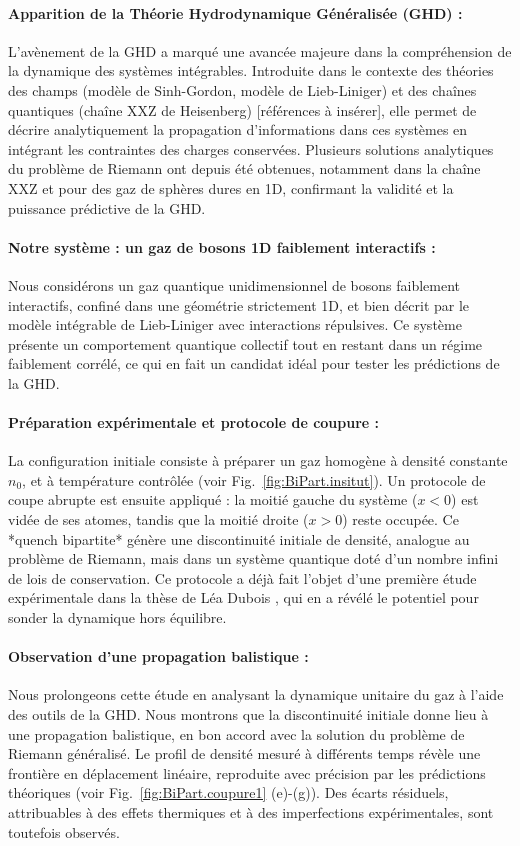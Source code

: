 \paragraph{Apparition de la Théorie Hydrodynamique Généralisée (GHD) :}
L’avènement de la GHD a marqué une avancée majeure dans la compréhension de la dynamique des systèmes intégrables. Introduite dans le contexte des théories des champs (modèle de Sinh-Gordon, modèle de Lieb-Liniger) et des chaînes quantiques (chaîne XXZ de Heisenberg) [références à insérer], elle permet de décrire analytiquement la propagation d’informations dans ces systèmes en intégrant les contraintes des charges conservées. Plusieurs solutions analytiques du problème de Riemann ont depuis été obtenues, notamment dans la chaîne XXZ et pour des gaz de sphères dures en 1D, confirmant la validité et la puissance prédictive de la GHD.

\paragraph{Notre système : un gaz de bosons 1D faiblement interactifs :}
Nous considérons un gaz quantique unidimensionnel de bosons faiblement interactifs, confiné dans une géométrie strictement 1D, et bien décrit par le modèle intégrable de Lieb-Liniger avec interactions répulsives. Ce système présente un comportement quantique collectif tout en restant dans un régime faiblement corrélé, ce qui en fait un candidat idéal pour tester les prédictions de la GHD.

\paragraph{Préparation expérimentale et protocole de coupure :}
La configuration initiale consiste à préparer un gaz homogène à densité constante $n_0$, et à température contrôlée (voir Fig.~\ref{fig:BiPart.insitut}). Un protocole de coupe abrupte est ensuite appliqué : la moitié gauche du système ($x<0$) est vidée de ses atomes, tandis que la moitié droite ($x>0$) reste occupée. Ce *quench bipartite* génère une discontinuité initiale de densité, analogue au problème de Riemann, mais dans un système quantique doté d’un nombre infini de lois de conservation. Ce protocole a déjà fait l’objet d’une première étude expérimentale dans la thèse de Léa Dubois \cite{DuboisThese}, qui en a révélé le potentiel pour sonder la dynamique hors équilibre.

\paragraph{Observation d’une propagation balistique :}
Nous prolongeons cette étude en analysant la dynamique unitaire du gaz à l’aide des outils de la GHD. Nous montrons que la discontinuité initiale donne lieu à une propagation balistique, en bon accord avec la solution du problème de Riemann généralisé. Le profil de densité mesuré à différents temps révèle une frontière en déplacement linéaire, reproduite avec précision par les prédictions théoriques (voir Fig.~\ref{fig:BiPart.coupure1} (e)-(g)). Des écarts résiduels, attribuables à des effets thermiques et à des imperfections expérimentales, sont toutefois observés.

